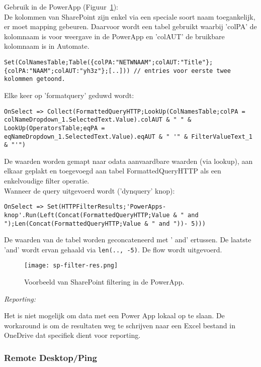 Gebruik in de PowerApp (Figuur~\ref{fig:sp-filter-res}):\\
De kolommen van SharePoint zijn enkel via een speciale soort naam toegankelijk, er moet mapping gebeuren. Daarvoor wordt een tabel gebruikt waarbij 'colPA' de kolomnaam is voor weergave in de PowerApp en 'colAUT' de bruikbare kolomnaam is in Automate.
\begin{lstlisting}
Set(ColNamesTable;Table({colPA:"NETWNAAM";colAUT:"Title"};{colPA:"NAAM";colAUT:"yh3z"};[..])) // entries voor eerste twee kolommen getoond.
\end{lstlisting}
Elke keer op 'formatquery' geduwd wordt:
\begin{lstlisting}
OnSelect => Collect(FormattedQueryHTTP;LookUp(ColNamesTable;colPA = colNameDropdown_1.SelectedText.Value).colAUT & " " & LookUp(OperatorsTable;eqPA = eqNameDropdown_1.SelectedText.Value).eqAUT & " '" & FilterValueText_1 & "'")
\end{lstlisting}
De waarden worden gemapt naar odata aanvaardbare waarden (via lookup), aan elkaar geplakt en toegevoegd aan tabel FormattedQueryHTTP als een enkelvoudige filter operatie.\\
Wanneer de query uitgevoerd wordt ('dynquery' knop):
\begin{lstlisting}
OnSelect => Set(HTTPFilterResults;'PowerApps-knop'.Run(Left(Concat(FormattedQueryHTTP;Value & " and ");Len(Concat(FormattedQueryHTTP;Value & " and "))- 5)))
\end{lstlisting}
De waarden van de tabel worden geconcateneerd met ' and' ertussen. De laatste 'and' wordt ervan gehaald via \lstinline|len(.., -5)|. De flow wordt uitgevoerd.

\begin{figure}[h!]
    \centering
    \texttt{[image: sp-filter-res.png]}
    \caption{Voorbeeld van SharePoint filtering in de PowerApp.}
    \label{fig:sp-filter-res}
\end{figure}

\textit{Reporting:}

Het is niet mogelijk om data met een Power App lokaal op te slaan. De workaround is om de resultaten weg te schrijven naar een Excel bestand in OneDrive dat specifiek dient voor reporting.

\subsubsection{Remote Desktop/Ping}
\label{subsec:rdp-ping}

